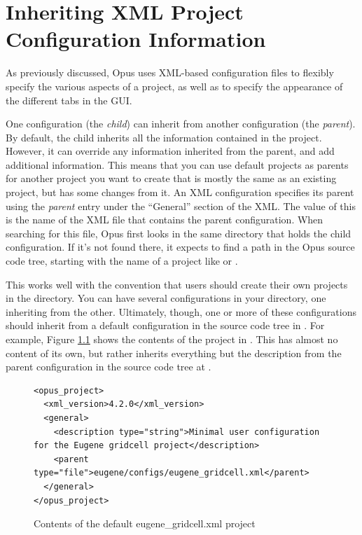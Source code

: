 \chapter{Inheriting XML Project Configuration Information}
\label{chapter:xml-inheritance}

As previously discussed, Opus uses XML-based configuration files to
flexibly specify the various aspects of a project, as well as to specify the
appearance of the different tabs in the GUI\@.

One configuration (the \emph{child}) can inherit from another configuration
(the \emph{parent}).  By default, the child inherits all the information
contained in the project.  However, it can override any information
inherited from the parent, and add additional information.  This means that
you can use default projects as parents for another project you want to
create that is mostly the same as an existing project, but has some changes
from it.  An XML configuration specifies its parent using the \emph{parent}
entry under the ``General'' section of the XML\@.  The value of this is the
name of the XML file that contains the parent configuration.  When
searching for this file, Opus first looks in the same directory that holds
the child configuration.  If it's not found there, it expects to find a
path in the Opus source code tree, starting with the name of a project like
 or .

This works well with the convention that users should create their own
projects in the  directory.  You can have
several configurations in your  directory, one
inheriting from the other.  Ultimately, though, one or more of these
configurations should inherit from a default configuration in the source
code tree in .  For example, Figure
\ref{fig:eugene-gridcell-xml-default} shows the contents of the
 project in .  This
has almost no content of its own, but rather inherits everything but the
description from the parent configuration in the source code tree at
.

\begin{figure}[htp]
\begin{center}
\begin{verbatim}
<opus_project>
  <xml_version>4.2.0</xml_version>
  <general>
    <description type="string">Minimal user configuration for the Eugene gridcell project</description>
    <parent type="file">eugene/configs/eugene_gridcell.xml</parent>
  </general>
</opus_project>
\end{verbatim}
\end{center}
\caption{Contents of the default eugene\_gridcell.xml project}
\label{fig:eugene-gridcell-xml-default}
\end{figure}

